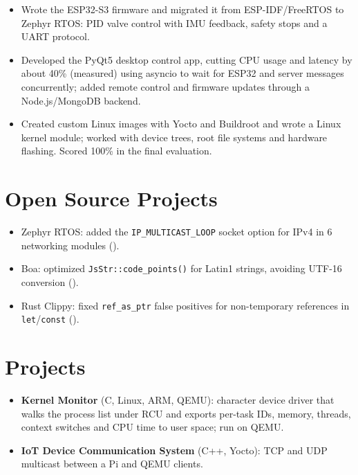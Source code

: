 \documentclass[10pt]{article}
\begin{document}
\begin{itemize}
  \item Wrote the ESP32-S3 firmware and migrated it from ESP-IDF/FreeRTOS to Zephyr RTOS: PID valve control with IMU feedback, safety stops and a UART protocol.
  \item Developed the PyQt5 desktop control app, cutting CPU usage and latency by about 40\% (measured) using asyncio to wait for ESP32 and server messages concurrently; added remote control and firmware updates through a Node.js/MongoDB backend.
\end{itemize}
\begin{itemize}
  \item Created custom Linux images with Yocto and Buildroot and wrote a Linux kernel module; worked with device trees, root file systems and hardware flashing. Scored 100\% in the final evaluation.
\end{itemize}

\section*{Open Source Projects}
\begin{itemize}
  \item Zephyr RTOS: added the \texttt{IP\_MULTICAST\_LOOP} socket option for IPv4 in 6 networking modules ().
  \item Boa: optimized \texttt{JsStr::code\_points()} for Latin1 strings, avoiding UTF-16 conversion ().
  \item Rust Clippy: fixed \texttt{ref\_as\_ptr} false positives for non-temporary references in \texttt{let}/\texttt{const} ().
\end{itemize}

\section*{Projects}
\begin{itemize}
  \item \textbf{Kernel Monitor} (C, Linux, ARM, QEMU): character device driver that walks the process list under RCU and exports per-task IDs, memory, threads, context switches and CPU time to user space; run on QEMU. 
  \item \textbf{IoT Device Communication System} (C++, Yocto): TCP and UDP multicast between a Pi and QEMU clients. 
\end{itemize}
\end{document}

